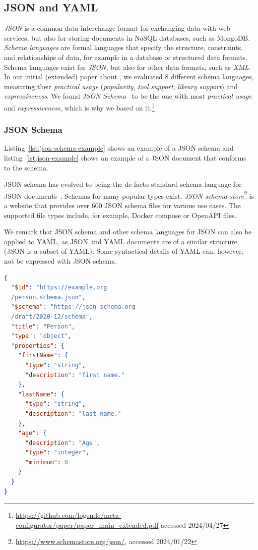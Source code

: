 \subsection{JSON and YAML}

\textit{JSON} is a common data-interchange format for exchanging data with web services, but also for storing documents in NoSQL databases, such as MongoDB\@\cite{marrs2017json}.
\textit{Schema languages} are formal languages that specify the structure, constraints, and relationships of data, for example in a database or structured data formats.
Schema languages exist for \textit{JSON}\cite{jsonSchema, jsonschemaJSONSchema,Apache-Avro,rfc8927,Kappestein_2023}, but also for other data formats, such as \textit{XML}\cite{dtd_spec, xsd_spec, xml_schemas_1, xml_schemas_2}.
In our initial (extended) paper about \toolname{}, we evaluated 8 different schema languages, measuring their \textit{practical usage} (\textit{popularity}, \textit{tool support}, \textit{library support}) and \textit{expressiveness}.
We found \textit{JSON Schema}~\cite{jsonSchema, jsonschemaJSONSchema} to be the one with most \textit{practical usage} and \textit{expressiveness}, which is why we based \toolname{} on it.\footnote{\url{https://github.com/logende/meta-configurator/paper/paper_main_extended.pdf} accessed 2024/04/27}

\subsubsection{JSON Schema}
Listing~\ref{lst:json-schema-example} shows an example of a JSON schema and listing~\ref{lst:json-example} shows an example of a JSON document that conforms to the schema.

JSON schema has evolved to being the de-facto standard schema language for JSON documents~\cite{baazizi2021empirical}.
Schemas for many popular \cfgfile{} types exist.
\textit{JSON schema store}\footnote{\url{https://www.schemastore.org/json/}, accessed 2024/01/22} is a website that provides over 600 JSON schema files for various use cases.
The supported file types include, for example, Docker compose or OpenAPI files.

We remark that JSON schema and other schema languages for JSON can also be applied to YAML, as JSON and YAML documents are of a similar structure (JSON is a subset of YAML).
Some syntactical details of YAML can, however, not be expressed with JSON schema.


\begin{lstlisting}[language=json,firstnumber=1,caption={JSON schema example},captionpos=b,label={lst:json-schema-example}]
{
  "$id": "https://example.org
  /person.schema.json",
  "$schema": "https://json-schema.org
  /draft/2020-12/schema",
  "title": "Person",
  "type": "object",
  "properties": {
    "firstName": {
      "type": "string",
      "description": "first name."
    },
    "lastName": {
      "type": "string",
      "description": "last name."
    },
    "age": {
      "description": "Age",
      "type": "integer",
      "minimum": 0
    }
  }
}
\end{lstlisting}


